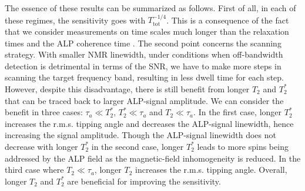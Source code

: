 \documentclass{WileyMSP-template}
\newcommand{\YZ}[1]{\textcolor{purple}{Yuzhe: #1}}
\newcommand{\DK}[1]{\textcolor{brown}{Derek: #1}}
\newcommand{\AW}[1]{\textcolor{cyan}{Arne: #1}}
\begin{document}
The essence of these results can be summarized as follows. 
First of all, in each of these regimes, the sensitivity goes with $T_{\mathrm{tot}}^{-1/4}$. 
This is a consequence of the fact that we consider measurements on time scales much longer than the relaxation times and the ALP coherence time \cite{budkergraham2014proposal, Aybas_2021_Quantum_sensitivity}. 
The second point concerns the scanning strategy. 
With smaller NMR linewidth, under conditions when off-bandwidth detection is detrimental in terms of the SNR,  we have to make more steps in scanning the target frequency band, resulting in less dwell time for each step. 
However, despite this disadvantage, 
there is still benefit from longer $T_2$ and $T_2^*$ that can be traced back to larger ALP-signal amplitude. 
We can consider the benefit in three cases: $\tau_a\ll T_2^* $, $T_2^* \ll \tau_a$ and $T_2 \ll \tau_a$. 
In the first case, longer $T_2^*$ increases the r.m.s. tipping angle and decreases the ALP-signal linewidth, hence increasing the signal amplitude. 
Though the ALP-signal linewidth does not decrease with longer $T_2^*$ in the second case, longer $T_2^*$ leads to more spins being addressed by the ALP field as the magnetic-field inhomogeneity is reduced.
In the third case where $T_2 \ll \tau_a$, longer $T_2$ increases the r.m.s. tipping angle. 
Overall, longer $T_2$ and $T_2^*$ are beneficial for improving the sensitivity. 
\end{document}
